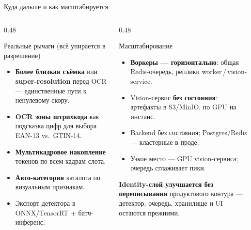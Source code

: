 \documentclass[aspectratio=169,10pt]{beamer}
\newcommand{\code}[1]{{\ttfamily\small\color{slate}#1}}
\newcommand{\hl}[1]{{\bfseries\color{accent}#1}}
\begin{document}
\begin{frame}{Куда дальше и как масштабируется}
  \begin{columns}[T,onlytextwidth]
    \begin{column}{0.48\textwidth}
      \begin{block}{Реальные рычаги (всё упирается в разрешение)}\footnotesize
        \begin{itemize}\setlength\itemsep{1.5pt}
          \item \hl{Более близкая съёмка} или \hl{super-resolution} перед OCR — единственные пути к ненулевому скору.
          \item \hl{OCR зоны штрихкода} как подсказка цифр для выбора EAN-13 vs.\ GTIN-14.
          \item \hl{Мультикадровое накопление} токенов по всем кадрам слота.
          \item \hl{Авто-категория} каталога по визуальным признакам.
          \item Экспорт детектора в ONNX/TensorRT + батч-инференс.
        \end{itemize}
      \end{block}
    \end{column}
    \begin{column}{0.48\textwidth}
      \begin{block}{Масштабирование}\footnotesize
        \begin{itemize}\setlength\itemsep{1.5pt}
          \item \hl{Воркеры — горизонтально}: общая Redis-очередь, реплики \code{worker}\,/\,\code{vision-service}.
          \item Vision-сервис \hl{без состояния}: артефакты в S3/MinIO, по GPU на инстанс.
          \item Backend без состояния; Postgres/Redis — кластерные в проде.
          \item Узкое место — GPU vision-сервиса; очередь сглаживает пики.
        \end{itemize}
      \end{block}
      \vspace{0.25em}
      {\scriptsize\color{slate} \hl{Identity-слой улучшается без переписывания} продуктового контура — детектор, очередь, хранилище и UI остаются прежними.}
    \end{column}
  \end{columns}
\end{frame}
\end{document}
